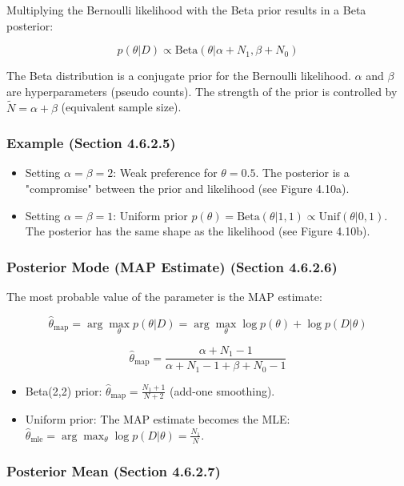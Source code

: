 \documentclass{article}
\begin{document}
Multiplying the Bernoulli likelihood with the Beta prior results in a Beta posterior:

$$
p(\theta|D) \propto \text{Beta}(\theta|\alpha+N_1, \beta+N_0)
$$

The Beta distribution is a conjugate prior for the Bernoulli likelihood. $\alpha$ and $\beta$ are hyperparameters (pseudo counts). The strength of the prior is controlled by $\tilde{N} = \alpha + \beta$ (equivalent sample size).

\subsubsection{Example (Section 4.6.2.5)}

\begin{itemize}
    \item Setting $\alpha = \beta = 2$: Weak preference for $\theta = 0.5$.  The posterior is a "compromise" between the prior and likelihood (see Figure 4.10a).
    \item Setting $\alpha = \beta = 1$: Uniform prior $p(\theta) = \text{Beta}(\theta|1, 1) \propto \text{Unif}(\theta|0, 1)$. The posterior has the same shape as the likelihood (see Figure 4.10b).
\end{itemize}

\subsubsection{Posterior Mode (MAP Estimate) (Section 4.6.2.6)}

The most probable value of the parameter is the MAP estimate:

$$
\hat{\theta}_{\text{map}} = \arg \max_{\theta} p(\theta|D) = \arg \max_{\theta} \log p(\theta) + \log p(D|\theta)
$$

$$
\hat{\theta}_{\text{map}} = \frac{\alpha + N_1 - 1}{\alpha + N_1 - 1 + \beta + N_0 - 1}
$$

\begin{itemize}
    \item Beta(2,2) prior: $\hat{\theta}_{\text{map}} = \frac{N_1 + 1}{N + 2}$ (add-one smoothing).
    \item Uniform prior: The MAP estimate becomes the MLE: $\hat{\theta}_{\text{mle}} = \arg \max_{\theta} \log p(D|\theta) = \frac{N_1}{N}$.
\end{itemize}

\subsubsection{Posterior Mean (Section 4.6.2.7)}
\end{document}
